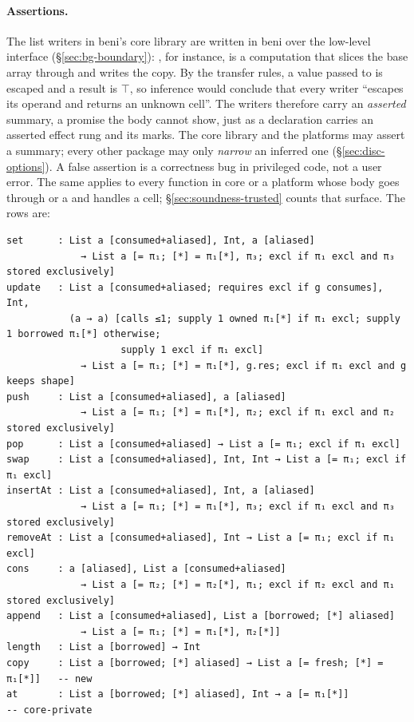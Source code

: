 \paragraph{Assertions.} The list writers in beni's core library are written in beni over the
low-level  interface (\S\ref{sec:bg-boundary}): , for instance, is a
 computation that slices the base array through  and writes the copy. By
the transfer rules, a value passed to  is escaped and a  result is $\top$, so
inference would conclude that every writer ``escapes its operand and returns an unknown cell''. The
writers therefore carry an \emph{asserted} summary, a promise the body cannot show, just as a
 declaration carries an asserted effect rung and its  marks. The core library
and the platforms may assert a summary; every other package may only \emph{narrow} an inferred one
(\S\ref{sec:disc-options}). A false assertion is a correctness bug in privileged code, not a user
error. The same applies to every function in core or a platform whose body goes through  or a
 and handles a cell; \S\ref{sec:soundness-trusted} counts that surface. The rows are:
\begin{Verbatim}
set      : List a [consumed+aliased], Int, a [aliased]
             → List a [= π₁; [*] = π₁[*], π₃; excl if π₁ excl and π₃ stored exclusively]
update   : List a [consumed+aliased; requires excl if g consumes], Int,
           (a → a) [calls ≤1; supply 1 owned π₁[*] if π₁ excl; supply 1 borrowed π₁[*] otherwise;
                    supply 1 excl if π₁ excl]
             → List a [= π₁; [*] = π₁[*], g.res; excl if π₁ excl and g keeps shape]
push     : List a [consumed+aliased], a [aliased]
             → List a [= π₁; [*] = π₁[*], π₂; excl if π₁ excl and π₂ stored exclusively]
pop      : List a [consumed+aliased] → List a [= π₁; excl if π₁ excl]
swap     : List a [consumed+aliased], Int, Int → List a [= π₁; excl if π₁ excl]
insertAt : List a [consumed+aliased], Int, a [aliased]
             → List a [= π₁; [*] = π₁[*], π₃; excl if π₁ excl and π₃ stored exclusively]
removeAt : List a [consumed+aliased], Int → List a [= π₁; excl if π₁ excl]
cons     : a [aliased], List a [consumed+aliased]
             → List a [= π₂; [*] = π₂[*], π₁; excl if π₂ excl and π₁ stored exclusively]
append   : List a [consumed+aliased], List a [borrowed; [*] aliased]
             → List a [= π₁; [*] = π₁[*], π₂[*]]
length   : List a [borrowed] → Int
copy     : List a [borrowed; [*] aliased] → List a [= fresh; [*] = π₁[*]]   -- new
at       : List a [borrowed; [*] aliased], Int → a [= π₁[*]]               -- core-private
\end{Verbatim}
